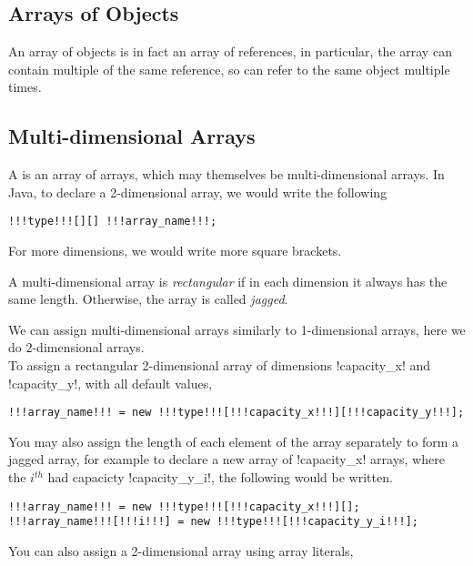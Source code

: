 \documentclass[11pt]{report}
\begin{document}
\subsection{Arrays of Objects}
An array of objects is in fact an array of references, in particular, the array can contain multiple of the same reference, so can refer to the same object multiple times.
\subsection{Multi-dimensional Arrays}
A  is an array of arrays, which may themselves be multi-dimensional arrays. In Java, to declare a 2-dimensional array, we would write the following
\vspace{-20pt}
\begin{lstlisting}[style=javaSyntax]
!!!type!!![][] !!!array_name!!!; 
\end{lstlisting}
For more dimensions, we would write more square brackets.
\begin{defi}
A multi-dimensional array is \emph{rectangular} if in each dimension it always has the same length. Otherwise, the array is called \emph{jagged}.
\end{defi}
\noindent We can assign multi-dimensional arrays similarly to 1-dimensional arrays, here we do 2-dimensional arrays.
\vspace{5pt} \\ To assign a rectangular 2-dimensional array of dimensions \inlineJava!capacity_x! and \inlineJava!capacity_y!, with all default values,
\vspace{-22pt}
\begin{lstlisting}[style=javaSyntax]
!!!array_name!!! = new !!!type!!![!!!capacity_x!!!][!!!capacity_y!!!]; 
\end{lstlisting}
You may also assign the length of each element of the array separately to form a jagged array, for example to declare a new array of \inlineJava!capacity_x! arrays, where the $i^{th}$ had capacicty \inlineJava!capacity_y_i!, the following would be written.
\vspace{-20pt}
\begin{lstlisting}[style=javaSyntax]
!!!array_name!!! = new !!!type!!![!!!capacity_x!!!][];
!!!array_name!!![!!!i!!!] = new !!!type!!![!!!capacity_y_i!!!];
\end{lstlisting}
You can also assign a 2-dimensional array using array literals,
\vspace{-20pt}
\end{document}
